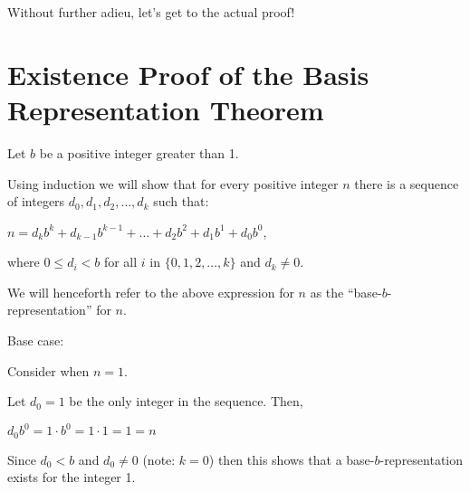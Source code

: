 \documentclass{article}
\newenvironment{jprIn}{\begin{adjustwidth}{2em}{}}{\end{adjustwidth}}
\begin{document}
Without further adieu, let's get to the actual proof!

\break
\section*{Existence Proof of the Basis Representation Theorem}
Let $b$ be a positive integer greater than 1.

Using induction we will show that for every positive integer $n$ there is a sequence
of integers $d_0, d_1, d_2,\dots{},d_k$ such that:

\hspace{3em}$n=d_kb^k+d_{k-1}b^{k-1}+\dots+d_2b^2+d_1b^1+d_0b^0$,

where $0\le{}d_i<b$ for all $i$ in $\{0,1,2,\dots{},k\}$ and $d_k\ne0$.

We will henceforth refer to the above expression for $n$ as the
``base-$b$-representation'' for $n$.

\bigskip
Base case:
\begin{jprIn}
Consider when $n=1$.

Let $d_0=1$ be the only integer in the sequence.  Then,

\hspace{3em}$d_0b^0=1\cdot{}b^0=1\cdot{}1=1=n$

Since $d_0<b$ and $d_0\ne0$ (note: $k=0$) then this
shows that a 
base-$b$-representation exists for the integer 1.
\end{jprIn}
\end{document}

